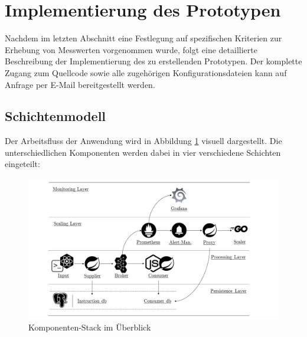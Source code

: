 \section{Implementierung des Prototypen}
\label{sec:implementierung}

Nachdem im letzten Abschnitt eine Festlegung auf spezifischen Kriterien zur Erhebung von Messwerten vorgenommen wurde, folgt eine detaillierte Beschreibung der Implementierung des zu erstellenden Prototypen. Der komplette Zugang zum  Quellcode sowie alle zugehörigen Konfigurationsdateien kann auf Anfrage per E-Mail bereitgestellt werden.

\subsection{Schichtenmodell}
Der Arbeitsfluss der Anwendung wird in Abbildung \ref{fig:stackOverview} visuell dargestellt. Die unterschiedlichen Komponenten werden dabei in vier verschiedene Schichten eingeteilt: 

\begin{figure}[ht!]
	\centering
	\includegraphics[width=\linewidth]{kapitel/problemloesung/implementierung/_img/overview-bw}
	\caption[Komponenten-Stack im Überblick]{Komponenten-Stack im Überblick}
	\label{fig:stackOverview}
\end{figure}

